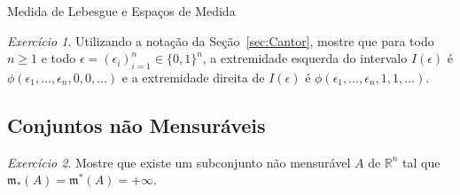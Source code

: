 \documentclass[oneside,final,11pt]{amsbook}
\newcommand{\R}{\mathds R}
\newcommand{\leb}{\mathfrak m}
\theoremstyle{remark}\newtheorem{exercise}{Exercício}[chapter]
\theoremstyle{remark}\newtheorem{*exercise}[exercise]{\hbox to 0pt{\hskip 0pt minus 1fil*}Exercício}
\theoremstyle{definition}\newtheorem{exdefin}{Definição}[chapter]
\theoremstyle{plain}\newtheorem{teo}{Teorema}[section]
\theoremstyle{plain}\newtheorem{lem}[teo]{Lema}
\theoremstyle{plain}\newtheorem{prop}[teo]{Proposição}
\theoremstyle{plain}\newtheorem{cor}[teo]{Corolário}
\theoremstyle{definition}\newtheorem{defin}[teo]{Definição}
\theoremstyle{remark}\newtheorem{rem}[teo]{Observação}
\theoremstyle{definition}\newtheorem{notation}[teo]{Notação}
\theoremstyle{definition}\newtheorem{convention}[teo]{Convenção}
\theoremstyle{definition}\newtheorem{example}[teo]{Exemplo}
\numberwithin{section}{chapter}
\numberwithin{equation}{section}
\begin{document}
\begin{chapter}{Medida de Lebesgue e Espaços de Medida}
\begin{exercise}
Utilizando a notação da Seção~\ref{sec:Cantor}, mostre que para todo $n\ge1$ e todo
$\epsilon=(\epsilon_i)_{i=1}^n\in\{0,1\}^n$, a extremidade esquerda do intervalo $I(\epsilon)$ é
$\phi(\epsilon_1,\ldots,\epsilon_n,0,0,\ldots)$ e a extremidade direita de $I(\epsilon)$
é $\phi(\epsilon_1,\ldots,\epsilon_n,1,1,\ldots)$.
\end{exercise}

\subsection*{Conjuntos não Mensuráveis}

\begin{exercise}
Mostre que existe um subconjunto não mensurável $A$ de $\R^n$ tal que $\leb_*(A)=\leb^*(A)=+\infty$.
\end{exercise}

\end{chapter}
\end{document}
